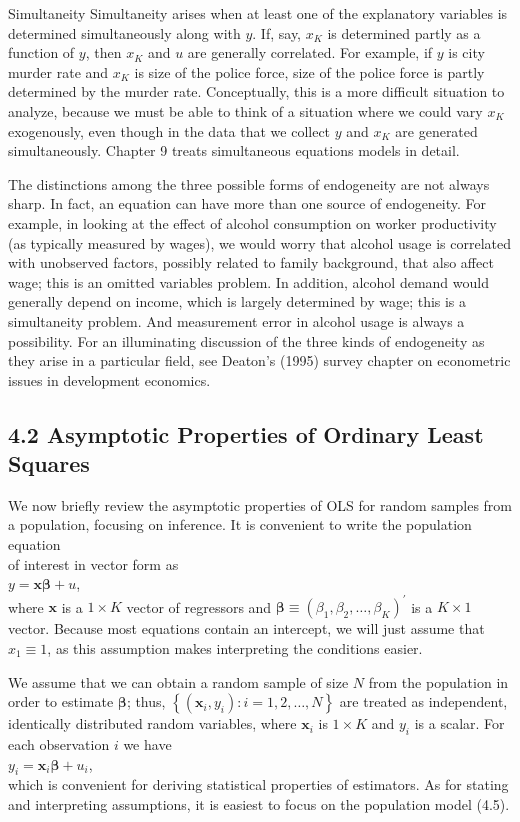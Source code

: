 \documentclass[10pt]{article}
\begin{document}
Simultaneity Simultaneity arises when at least one of the explanatory variables is determined simultaneously along with $y$. If, say, $x_{K}$ is determined partly as a function of $y$, then $x_{K}$ and $u$ are generally correlated. For example, if $y$ is city murder rate and $x_{K}$ is size of the police force, size of the police force is partly determined by the murder rate. Conceptually, this is a more difficult situation to analyze, because we must be able to think of a situation where we could vary $x_{K}$ exogenously, even though in the data that we collect $y$ and $x_{K}$ are generated simultaneously. Chapter 9 treats simultaneous equations models in detail.

The distinctions among the three possible forms of endogeneity are not always sharp. In fact, an equation can have more than one source of endogeneity. For example, in looking at the effect of alcohol consumption on worker productivity (as typically measured by wages), we would worry that alcohol usage is correlated with unobserved factors, possibly related to family background, that also affect wage; this is an omitted variables problem. In addition, alcohol demand would generally depend on income, which is largely determined by wage; this is a simultaneity problem. And measurement error in alcohol usage is always a possibility. For an illuminating discussion of the three kinds of endogeneity as they arise in a particular field, see Deaton's (1995) survey chapter on econometric issues in development economics.

\subsection*{4.2 Asymptotic Properties of Ordinary Least Squares}
We now briefly review the asymptotic properties of OLS for random samples from a population, focusing on inference. It is convenient to write the population equation\\
of interest in vector form as\\
$y=\mathbf{x} \boldsymbol{\beta}+u$,\\
where $\mathbf{x}$ is a $1 \times K$ vector of regressors and $\boldsymbol{\beta} \equiv\left(\beta_{1}, \beta_{2}, \ldots, \beta_{K}\right)^{\prime}$ is a $K \times 1$ vector. Because most equations contain an intercept, we will just assume that $x_{1} \equiv 1$, as this assumption makes interpreting the conditions easier.

We assume that we can obtain a random sample of size $N$ from the population in order to estimate $\boldsymbol{\beta}$; thus, $\left\{\left(\mathbf{x}_{i}, y_{i}\right): i=1,2, \ldots, N\right\}$ are treated as independent, identically distributed random variables, where $\mathbf{x}_{i}$ is $1 \times K$ and $y_{i}$ is a scalar. For each observation $i$ we have\\
$y_{i}=\mathbf{x}_{i} \boldsymbol{\beta}+u_{i}$,\\
which is convenient for deriving statistical properties of estimators. As for stating and interpreting assumptions, it is easiest to focus on the population model (4.5).
\end{document}

